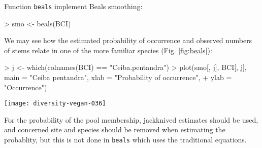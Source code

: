 \documentclass[a4paper,10pt]{amsart}
\begin{document}
Function \texttt{beals} implement Beals smoothing:
\begin{Schunk}
\begin{Sinput}
> smo <- beals(BCI)
\end{Sinput}
\end{Schunk}
We may see how the estimated probability of occurrence and observed
numbers of stems relate in one of the more familiar species
(Fig. \ref{fig:beals}):
\begin{Schunk}
\begin{Sinput}
> j <- which(colnames(BCI) == "Ceiba.pentandra")
> plot(smo[, j], BCI[, j], main = "Ceiba pentandra", xlab = "Probability of occurrence", 
+     ylab = "Occurrence")
\end{Sinput}
\end{Schunk}
\begin{SCfigure}
\texttt{[image: diversity-vegan-036]}
\caption{Beals smoothing for \emph{Ceiba pentandra}.}
\label{fig:beals}
\end{SCfigure}
For the probability of the pool membership, jackknived estimates
should be used, and concerned site and species should be removed when
estimating the probablity, but this is not done in \texttt{beals}
which uses the traditional equations.
\end{document}
